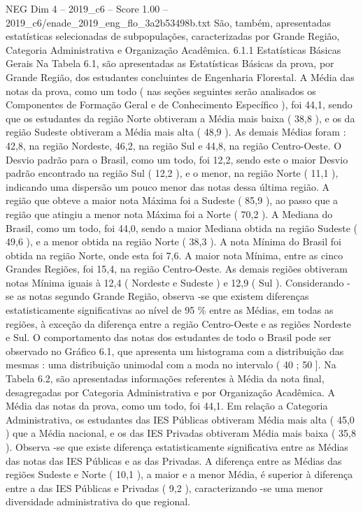 \begin{textsample}{NEG Dim 4 – 2019\_c6 – Score 1.00 – 2019\_c6/enade\_2019\_eng\_flo\_3a2b53498b.txt}
São, também, apresentadas estatísticas selecionadas de subpopulações, caracterizadas por Grande Região, Categoria Administrativa e Organização Acadêmica. 6.1.1 Estatísticas Básicas Gerais Na Tabela 6.1, são apresentadas as Estatísticas Básicas da prova, por Grande Região, dos estudantes concluintes de Engenharia Florestal.
A Média das notas da prova, como um todo ( nas seções seguintes serão analisados os Componentes de Formação Geral e de Conhecimento Específico ), foi 44,1, sendo que os estudantes da região Norte obtiveram a Média mais baixa ( 38,8 ), e os da região Sudeste obtiveram a Média mais alta ( 48,9 ).
As demais Médias foram : 42,8, na região Nordeste, 46,2, na região Sul e 44,8, na região Centro-Oeste.
O Desvio padrão para o Brasil, como um todo, foi 12,2, sendo este o maior Desvio padrão encontrado na região Sul ( 12,2 ), e o menor, na região Norte ( 11,1 ), indicando uma dispersão um pouco menor das notas dessa última região.
A região que obteve a maior nota Máxima foi a Sudeste ( 85,9 ), ao passo que a região que atingiu a menor nota Máxima foi a Norte ( 70,2 ).
A Mediana do Brasil, como um todo, foi 44,0, sendo a maior Mediana obtida na região Sudeste ( 49,6 ), e a menor obtida na região Norte ( 38,3 ).
A nota Mínima do Brasil foi obtida na região Norte, onde esta foi 7,6.
A maior nota Mínima, entre as cinco Grandes Regiões, foi 15,4, na região Centro-Oeste.
As demais regiões obtiveram notas Mínima iguais à 12,4 ( Nordeste e Sudeste ) e 12,9 ( Sul ).
Considerando -se as notas segundo Grande Região, observa -se que existem diferenças estatisticamente significativas ao nível de 95 \% entre as Médias, em todas as regiões, à exceção da diferença entre a região Centro-Oeste e as regiões Nordeste e Sul.
O comportamento das notas dos estudantes de todo o Brasil pode ser observado no Gráfico 6.1, que apresenta um histograma com a distribuição das mesmas : uma distribuição unimodal com a moda no intervalo ( 40 ; 50 ].
Na Tabela 6.2, são apresentadas informações referentes à Média da nota final, desagregadas por Categoria Administrativa e por Organização Acadêmica.
A Média das notas da prova, como um todo, foi 44,1.
Em relação a Categoria Administrativa, os estudantes das IES Públicas obtiveram Média mais alta ( 45,0 ) que a Média nacional, e os das IES Privadas obtiveram Média mais baixa ( 35,8 ).
Observa -se que existe diferença estatisticamente significativa entre as Médias das notas das IES Públicas e as das Privadas.
A diferença entre as Médias das regiões Sudeste e Norte ( 10,1 ), a maior e a menor Média, é superior à diferença entre a das IES Públicas e Privadas ( 9,2 ), caracterizando -se uma menor diversidade administrativa do que regional.

\end{textsample}

